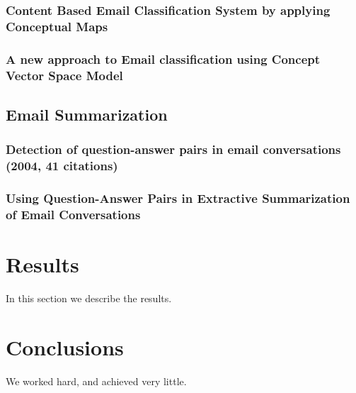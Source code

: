 \documentclass[12pt]{article}
\begin{document}
\subsubsection{Content Based Email Classification System by applying Conceptual Maps}
\subsubsection{A new approach to Email classification using Concept Vector Space Model}

\subsection{Email Summarization}
\subsubsection{Detection of question-answer pairs in email conversations (2004, 41 citations)}
\subsubsection{Using Question-Answer Pairs in Extractive Summarization of Email Conversations}

\section{Results}\label{results}
In this section we describe the results.

\section{Conclusions}\label{conclusions}
We worked hard, and achieved very little.



\end{document}
